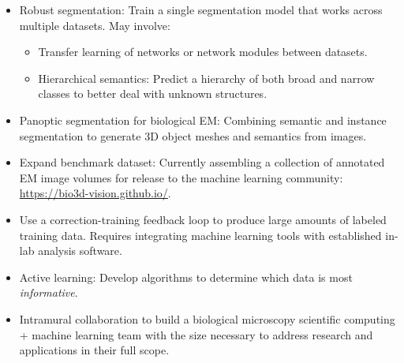 \documentclass[final]{beamer}
\newlength{\onecolwid}
\renewcommand{\emph}[1]{{\color{nibib2} #1}}
\begin{document}
\begin{frame}[t]
\begin{columns}[t]
\begin{column}{\onecolwid}
    \begin{tcolorbox}[title=Future Work]
		\begin{itemize}
            \item \emph{Robust segmentation}: Train a single segmentation model that works across multiple datasets. May involve:
            \begin{itemize}
            \item Transfer learning of networks or network modules between datasets.
            \item \emph{Hierarchical semantics}: Predict a hierarchy of both broad and narrow classes to better deal with unknown structures.
            \end{itemize}
            \item \emph{Panoptic segmentation} for biological EM: Combining semantic and instance segmentation to generate 3D object meshes and semantics from images.
            \item \emph{Expand benchmark dataset}: Currently assembling a collection of annotated EM image volumes for release to the machine learning community: \href{https://bio3d-vision.github.io/}{https://bio3d-vision.github.io/}.
            \item Use a \emph{correction-training feedback loop} to produce large amounts of labeled training data. Requires integrating machine learning tools with established in-lab analysis software.
            \item \emph{Active learning:} Develop algorithms to determine which data is most \textit{informative}. 
            \item \emph{Intramural collaboration} to build a biological microscopy scientific computing + machine learning team with the size necessary to address research and applications in their full scope.
        \end{itemize}
    \end{tcolorbox}
    
    \begin{tcolorbox}[title=References]
        \nocite{GuayDesigning2018}
        \nocite{Guay2018problems}
        
        
        
    \end{tcolorbox}


\end{column}
\end{columns}
\end{frame}
\end{document}
